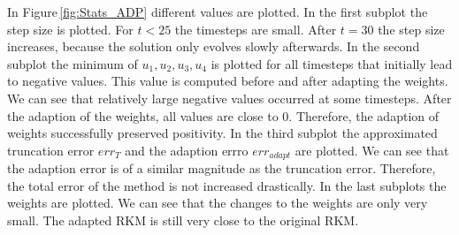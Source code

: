 \documentclass[a4paper]{article}
\numberwithin{equation}{section}
\theoremstyle{plain}
\theoremstyle{definition}
\numberwithin{theorem}{section}
\newcommand{\1}{\mathbbm{1}}
\begin{document}
In Figure\,\ref{fig:Stats_ADP} different values are plotted.  
In the first subplot the step size is plotted. For $t<25$ the timesteps are small. After $t = 30$ the step size increases, because the solution only evolves slowly afterwards. 
In the second subplot the minimum of $u_1,u_2,u_3,u_4$ is plotted for all timesteps that initially lead to negative values. This value is computed before and after adapting the weights.
We can see that relatively large negative values occurred at some timesteps. 
After the adaption of the weights, all values are close to $0$. Therefore, the adaption of weights successfully preserved positivity. 
In the third subplot the approximated truncation error $err_T$ and the adaption errro $err_{adapt}$ are plotted. 
We can see that the adaption error is of a similar magnitude as the truncation error. Therefore, the total error of the method is not increased drastically.  
In the last subplots the weights are plotted.  
We can see that the changes to the weights are only very small. The adapted RKM is still very close to the original RKM. 
\end{document}
